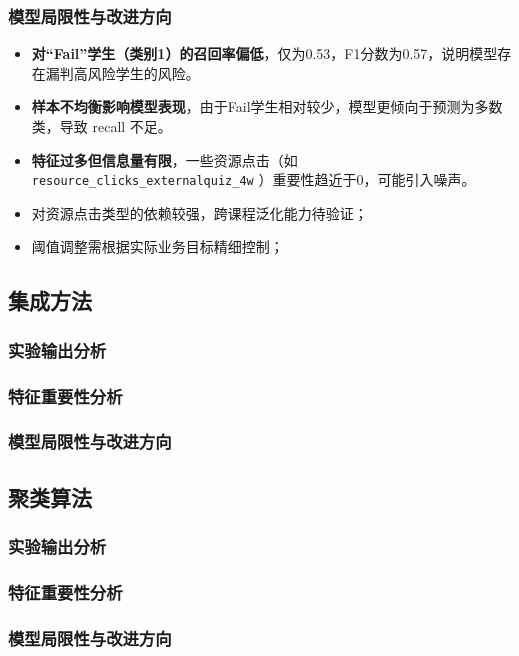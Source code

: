 \documentclass{SYSUReport}
\begin{document}
\subsubsection{模型局限性与改进方向}

\begin{itemize}
    \item \textbf{对“Fail”学生（类别1）的召回率偏低}，仅为0.53，F1分数为0.57，说明模型存在漏判高风险学生的风险。
    \item \textbf{样本不均衡影响模型表现}，由于Fail学生相对较少，模型更倾向于预测为多数类，导致 recall 不足。
    \item \textbf{特征过多但信息量有限}，一些资源点击（如 \texttt{resource\_clicks\_externalquiz\_4w}
）重要性趋近于0，可能引入噪声。
    \item 对资源点击类型的依赖较强，跨课程泛化能力待验证；
    \item 阈值调整需根据实际业务目标精细控制；
\end{itemize}


\subsection{集成方法}
\subsubsection{实验输出分析}
\subsubsection{特征重要性分析}
\subsubsection{模型局限性与改进方向}

\subsection{聚类算法}
\subsubsection{实验输出分析}
\subsubsection{特征重要性分析}
\subsubsection{模型局限性与改进方向}
\end{document}
